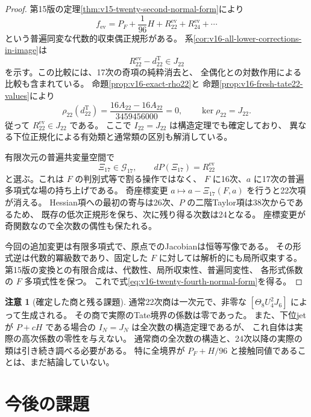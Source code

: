 \documentclass[a4paper,11pt]{ltjsarticle}
\theoremstyle{definition}
\newtheorem{remark}[theorem]{注意}
\begin{document}
\begin{proof}
第15版の定理\ref{thm:v15-twenty-second-normal-form}により
\[
 f_{\mathrm{ev}}=P_F+\frac1{96}H+R_{22}^{\mathrm{ev}}
                             +R_{24}^{\mathrm{ev}}+\cdots
\]
という普遍同変な代数的収束偶正規形がある。
系\ref{cor:v16-all-lower-corrections-in-image}は
\[
 R_{22}^{\mathrm{ev}}-d_{22}^{\mathrm T}\in J_{22}
\]
を示す。この比較には、17次の奇項の純粋消去と、
全偶化との対数作用による比較も含まれている。
命題\ref{prop:v16-exact-rho22}と
命題\ref{prop:v16-fresh-tate22-values}により
\[
 \rho_{22}(d_{22}^{\mathrm T})
   =\frac{16A_{22}-16A_{22}}{3459456000}=0,
 \qquad\ker\rho_{22}=J_{22}.
\]
従って $R_{22}^{\mathrm{ev}}\in J_{22}$ である。
ここで $I_{22}=J_{22}$ は構造定理でも確定しており、
異なる下位正規化による有効類と通常類の区別も解消している。

有限次元の普遍共変量空間で
\[
 \Xi_{17}\in\mathcal G_{17},\qquad
                       dP(\Xi_{17})=R_{22}^{\mathrm{ev}}
\]
と選ぶ。これは $F$ の判別式等で割る操作ではなく、
$F$ に16次、$a$ に17次の普遍多項式な場の持ち上げである。
奇座標変更 $a\mapsto a-\Xi_{17}(F,a)$ を行うと22次項が消える。
Hessian項への最初の寄与は26次、$P$ の二階Taylor項は38次からであるため、
既存の低次正規形を保ち、次に残り得る次数は24となる。
座標変更が奇関数なので全次数の偶性も保たれる。

今回の追加変更は有限多項式で、原点でのJacobianは恒等写像である。
その形式逆は代数的冪級数であり、固定した $F$ に対しては解析的にも局所収束する。
第15版の変換との有限合成は、代数性、局所収束性、普遍同変性、
各形式係数の $F$ 多項式性を保つ。
これで式\eqref{eq:v16-twenty-fourth-normal-form}を得る。
\end{proof}

\begin{remark}[確定した商と残る課題]
通常22次商は一次元で、非零な $[\Theta_8U_4^2J_6]$ によって生成される。
その商で実際のTate境界の係数は零であった。
また、下位jetが $P+cH$ である場合の $I_N=J_N$ は全次数の構造定理であるが、
これ自体は実際の高次係数の零性を与えない。
通常商の全次数の構造と、24次以降の実際の類は引き続き調べる必要がある。
特に全境界が $P_F+H/96$ と接触同値であることは、まだ結論していない。
\end{remark}


\clearpage
\section{今後の課題}
\end{document}
